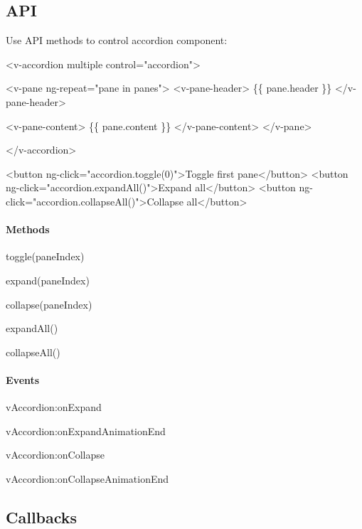\subsection*{A\+PI}

Use A\+PI methods to control accordion component\+:


\begin{DoxyCode}
<v-accordion multiple control="accordion">

  <v-pane ng-repeat="pane in panes">
    <v-pane-header>
      \{\{ pane.header \}\}
    </v-pane-header>

    <v-pane-content>
      \{\{ pane.content \}\}
    </v-pane-content>
  </v-pane>

</v-accordion>

<button ng-click="accordion.toggle(0)">Toggle first pane</button>
<button ng-click="accordion.expandAll()">Expand all</button>
<button ng-click="accordion.collapseAll()">Collapse all</button>
\end{DoxyCode}


\paragraph*{Methods}


\begin{DoxyItemize}
\item {\ttfamily toggle(pane\+Index)}
\item {\ttfamily expand(pane\+Index)}
\item {\ttfamily collapse(pane\+Index)}
\item {\ttfamily expand\+All()}
\item {\ttfamily collapse\+All()}
\end{DoxyItemize}

\paragraph*{Events}


\begin{DoxyItemize}
\item {\ttfamily v\+Accordion\+:on\+Expand}
\item {\ttfamily v\+Accordion\+:on\+Expand\+Animation\+End}
\item {\ttfamily v\+Accordion\+:on\+Collapse}
\item {\ttfamily v\+Accordion\+:on\+Collapse\+Animation\+End}
\end{DoxyItemize}

\subsection*{Callbacks}

